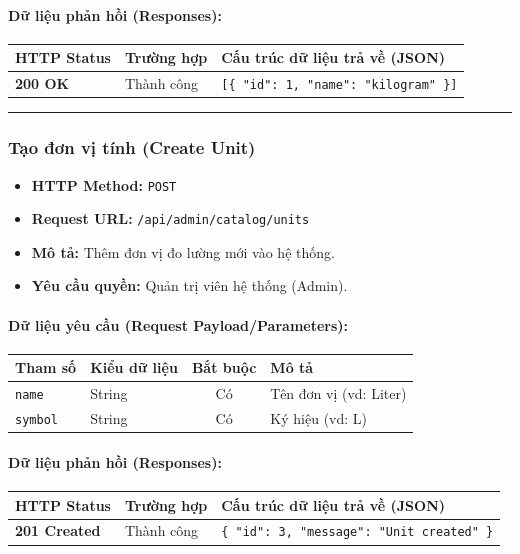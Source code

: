 \documentclass[12pt,a4paper]{article}
\begin{document}
\paragraph{Dữ liệu phản hồi (Responses):}
\begin{longtable}{|>{\raggedright\arraybackslash}p{2.8cm}|>{\raggedright\arraybackslash}p{3.2cm}|>{\raggedright\arraybackslash}p{8.0cm}|}
\hline
\textbf{HTTP Status} & \textbf{Trường hợp} & \textbf{Cấu trúc dữ liệu trả về (JSON)} \\ \hline
\endhead
\textbf{200 OK} & Thành công & \texttt{[\{ "id": 1, "name": "kilogram" \}]} \\ \hline
\end{longtable}

\vskip 0.4cm
\noindent\rule{\textwidth}{0.3pt}
\vskip 0.4cm

\subsubsection{Tạo đơn vị tính (Create Unit)}
\begin{itemize}[leftmargin=*]
    \item \textbf{HTTP Method:} \texttt{POST}
    \item \textbf{Request URL:} \texttt{/api/admin/catalog/units}
    \item \textbf{Mô tả:} Thêm đơn vị đo lường mới vào hệ thống.
    \item \textbf{Yêu cầu quyền:} Quản trị viên hệ thống (Admin).
\end{itemize}

\paragraph{Dữ liệu yêu cầu (Request Payload/Parameters):}
\begin{longtable}{|>{\raggedright\arraybackslash}p{2.8cm}|>{\raggedright\arraybackslash}p{2.2cm}|c|>{\raggedright\arraybackslash}p{7.0cm}|}
\hline
\textbf{Tham số} & \textbf{Kiểu dữ liệu} & \textbf{Bắt buộc} & \textbf{Mô tả} \\ \hline
\endhead
\texttt{name} & String & Có & Tên đơn vị (vd: Liter) \\ \hline
\texttt{symbol} & String & Có & Ký hiệu (vd: L) \\ \hline
\end{longtable}

\paragraph{Dữ liệu phản hồi (Responses):}
\begin{longtable}{|>{\raggedright\arraybackslash}p{2.8cm}|>{\raggedright\arraybackslash}p{3.2cm}|>{\raggedright\arraybackslash}p{8.0cm}|}
\hline
\textbf{HTTP Status} & \textbf{Trường hợp} & \textbf{Cấu trúc dữ liệu trả về (JSON)} \\ \hline
\endhead
\textbf{201 Created} & Thành công & \texttt{\{ "id": 3, "message": "Unit created" \}} \\ \hline
\end{longtable}
\end{document}
